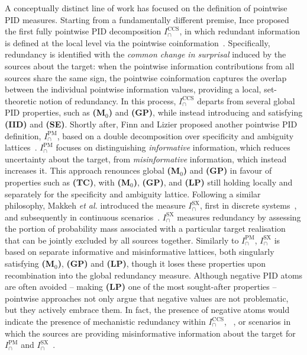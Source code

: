 \documentclass{article}
\makeatletter
\newcommand{\etal}{\textit{et al.\@} }
\newcommand{\ts}[1]{\ensuremath{_{\text{#1}}}}
\newcommand{\Mz}{\textbf{(M\ts{0})}\xspace} %
\newcommand{\GP}{\textbf{(GP)}\xspace} %
\newcommand{\IID}{\textbf{(IID)}\xspace} %
\newcommand{\TC}{\textbf{(TC)}\xspace} %
\newcommand{\SE}{\textbf{(SE)}\xspace} %
\newcommand{\LP}{\textbf{(LP)}\xspace}
\newcommand{\IPM}{\ensuremath{I_\cap^{\text{PM}}}\xspace}
\newcommand{\ICCS}{\ensuremath{I_\cap^{\text{CCS}}}\xspace}
\newcommand{\ISX}{\ensuremath{I_\cap^{\text{SX}}}\xspace}
\makeatother
\begin{document}
A conceptually distinct line of work has focused on the definition of pointwise PID measures. 
Starting from a fundamentally different premise, Ince proposed the first fully pointwise PID decomposition \ICCS, in which redundant information is defined at the local level via the pointwise coinformation~\cite{ince2017measuring}. Specifically, redundancy is identified with the \textit{common change in surprisal} induced by the sources about the target: when the pointwise information contributions from all sources share the same sign, the pointwise coinformation captures the overlap between the individual pointwise information values, providing a local, set-theoretic notion of redundancy. In this process, \ICCS departs from several global PID properties, such as \Mz and \GP, while instead introducing and satisfying \IID and \SE. 
Shortly after, Finn and Lizier proposed another pointwise PID definition, \IPM, based on a double decomposition over specificity and ambiguity lattices~\cite{finn2018probability, finn2018pointwise}. \IPM focuses on distinguishing \textit{informative} information, which reduces uncertainty about the target, from \textit{misinformative} information, which instead increases it. This approach renounces global \Mz and \GP in favour of properties such as \TC, with \Mz, \GP, and \LP still holding locally and separately for the specificity and ambiguity lattice. 
Following a similar philosophy, Makkeh \etal introduced the measure \ISX, first in discrete systems~\cite{makkeh2021introducing}, and subsequently in continuous scenarios~\cite{schick2021partial, ehrlich2024partial}. \ISX measures redundancy by assessing the portion of probability mass associated with a particular target realisation that can be jointly excluded by all sources together. Similarly to \IPM, \ISX is based on separate informative and misinformative lattices, both singularly satisfying \Mz, \GP and \LP, though it loses these properties upon recombination into the global redundancy measure.
Although negative PID atoms are often avoided -- making \LP one of the most sought-after properties -- pointwise approaches not only argue that negative values are not problematic, but they actively embrace them. In fact, the presence of negative atoms would indicate the presence of mechanistic redundancy within \ICCS, ~\cite{ince2017measuring}, or scenarios in which the sources are providing misinformative information about the target for \IPM and \ISX~\cite{finn2018pointwise, makkeh2021introducing}.
\end{document}

